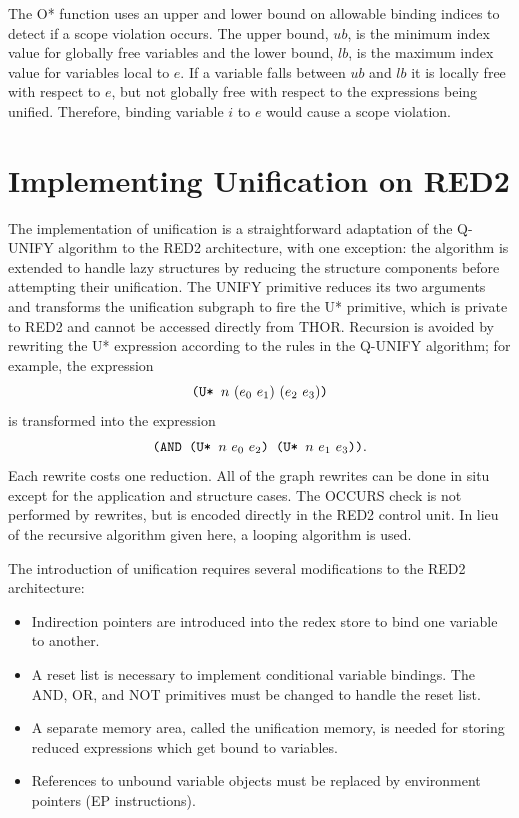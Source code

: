 The O* function uses an upper and lower bound on allowable binding indices to
detect if a scope violation occurs. The upper bound, \(ub\), is the minimum
index value for globally free variables and the lower bound, \(lb\), is the
maximum index value for variables local to \(e\). If a variable falls between
\(ub\) and \(lb\) it is locally free with respect to \(e\), but not globally free
with respect to the expressions being unified. Therefore, binding variable
\(i\) to \(e\) would cause a scope violation.

\section{Implementing Unification on RED2}

The implementation of unification is a straightforward adaptation of the
Q-UNIFY algorithm to the RED2 architecture, with one exception: the algorithm is
extended to handle lazy structures by reducing the structure components before
attempting their unification. The UNIFY primitive reduces its two arguments and
transforms the unification subgraph to fire the U* primitive, which is private
to RED2 and cannot be accessed directly from THOR. Recursion is avoided by
rewriting the U* expression according to the rules in the Q-UNIFY algorithm; for
example, the expression
\[
\THOR{(U* }n\ (e\sb{0}\ e\sb{1})\ (e\sb{2}\ e\sb{3})\THOR{)}
\]
is transformed into the expression
\[
\THOR{(AND (U* }n\ e\sb{0}\ e\sb{2}\THOR{) (U* }n\ e\sb{1}\ e\sb{3}\THOR{))}.
\]
Each rewrite costs one reduction. All of the graph rewrites can be done in situ
except for the application and structure cases. The OCCURS check is not
performed by rewrites, but is encoded directly in the RED2 control unit. In
lieu of the recursive algorithm given here, a looping algorithm is used.

The introduction of unification requires several modifications to the RED2
architecture:

\begin{itemize}
\item Indirection pointers are introduced into the redex store to bind one
variable to another.
\item A reset list is necessary to implement conditional variable bindings. The
AND, OR, and NOT primitives must be changed to handle the reset list.
\item A separate memory area, called the unification memory, is needed for
storing reduced expressions which get bound to variables.
\item References to unbound variable objects must be replaced by environment
pointers (EP instructions).
\end{itemize}

